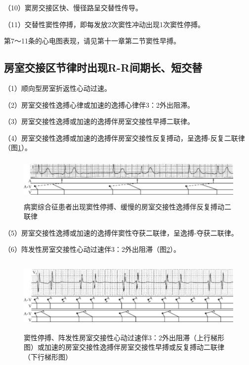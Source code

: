 （10）窦房交接区快、慢径路呈交替性传导。

（11）交替性窦性停搏，即每发放2次窦性冲动出现1次窦性停搏。

第7～11条的心电图表现，请见第十一章第二节窦性早搏。

\protect\hypertarget{text00009.htmlux5cux23subid65}{}{}

\subsection{房室交接区节律时出现R-R间期长、短交替}

（1）顺向型房室折返性心动过速。

（2）房室交接性逸搏心律或加速的逸搏心律伴3：2外出阻滞。

（3）房室交接性逸搏或加速的逸搏伴房室交接性早搏二联律。

（4）房室交接性逸搏或加速的逸搏伴房室交接性反复搏动，呈逸搏-反复二联律（图\ref{fig3-24}）。

\begin{figure}[!htbp]
 \centering
 \includegraphics[width=5.77083in,height=0.84375in]{./images/Image00074.jpg}
 \captionsetup{justification=centering}
 \caption{病窦综合征患者出现窦性停搏、缓慢的房室交接性逸搏伴反复搏动二联律}
 \label{fig3-24}
  \end{figure} 

（5）房室交接性逸搏或加速的逸搏伴窦性夺获二联律，呈逸搏-夺获二联律。

（6）阵发性房室交接性心动过速伴3：2外出阻滞（图\ref{fig3-25}）。

\begin{figure}[!htbp]
 \centering
 \includegraphics[width=5.79167in,height=1.45833in]{./images/Image00075.jpg}
 \captionsetup{justification=centering}
 \caption{窦性停搏、阵发性房室交接性心动过速伴3：2外出阻滞（上行梯形图）或加速的房室交接性逸搏伴房室交接性早搏或反复搏动二联律（下行梯形图）}
 \label{fig3-25}
  \end{figure} 

